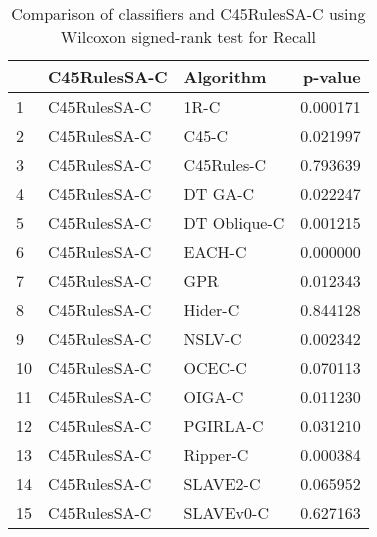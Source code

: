 \begin{table}
\footnotesize
\caption{Comparison of classifiers and C45RulesSA-C using Wilcoxon signed-rank test for Recall}
\label{tab:C45RulesSA-C wilcoxon Recall comparison}
\begin{tabular}{lllr}
\hline
 & C45RulesSA-C & Algorithm & p-value \\
\hline
1 & C45RulesSA-C & 1R-C & 0.000171 \\
2 & C45RulesSA-C & C45-C & 0.021997 \\
3 & C45RulesSA-C & C45Rules-C & 0.793639 \\
4 & C45RulesSA-C & DT GA-C & 0.022247 \\
5 & C45RulesSA-C & DT Oblique-C & 0.001215 \\
6 & C45RulesSA-C & EACH-C & 0.000000 \\
7 & C45RulesSA-C & GPR & 0.012343 \\
8 & C45RulesSA-C & Hider-C & 0.844128 \\
9 & C45RulesSA-C & NSLV-C & 0.002342 \\
10 & C45RulesSA-C & OCEC-C & 0.070113 \\
11 & C45RulesSA-C & OIGA-C & 0.011230 \\
12 & C45RulesSA-C & PGIRLA-C & 0.031210 \\
13 & C45RulesSA-C & Ripper-C & 0.000384 \\
14 & C45RulesSA-C & SLAVE2-C & 0.065952 \\
15 & C45RulesSA-C & SLAVEv0-C & 0.627163 \\
\hline
\end{tabular}
\end{table}
